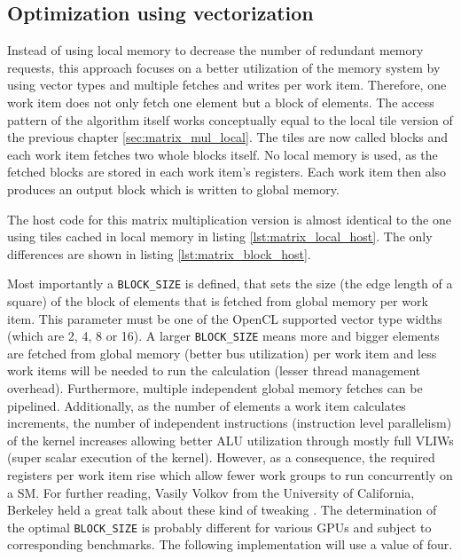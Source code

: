 \subsection{Optimization using vectorization}
\label{sec:matrix_mul_vec}
Instead of using local memory to decrease the number of redundant memory requests, this approach focuses on a better utilization of the memory system by using vector types and multiple fetches and writes per work item. Therefore, one work item does not only fetch one element but a block of elements.
The access pattern of the algorithm itself works conceptually equal to the local tile version of the previous chapter \ref{sec:matrix_mul_local}. The tiles are now called blocks and each work item fetches two whole blocks itself. No local memory is used, as the fetched blocks are stored in each work item's registers. Each work item then also produces an output block which is written to global memory.

The host code for this matrix multiplication version is almost identical to the one using tiles cached in local memory in listing \ref{lst:matrix_local_host}. The only differences are shown in listing \ref{lst:matrix_block_host}.



Most importantly a \lstinline!BLOCK_SIZE! is defined, that sets the size (the edge length of a square) of the block of elements that is fetched from global memory per work item. This parameter must be one of the OpenCL supported vector type widths (which are 2, 4, 8 or 16). A larger \lstinline!BLOCK_SIZE! means more and bigger elements are fetched from global memory (better bus utilization) per work item and less work items will be needed to run the calculation (lesser thread management overhead). Furthermore, multiple independent global memory fetches can be pipelined. Additionally, as the number of elements a work item calculates increments, the number of independent instructions (instruction level parallelism) of the kernel increases allowing better ALU utilization through mostly full VLIWs (super scalar execution of the kernel). However, as a consequence, the required registers per work item rise which allow fewer work groups to run concurrently on a SM. For further reading, Vasily Volkov from the University of California, Berkeley held a great talk about these kind of tweaking \cite{volkov}.
The determination of the optimal \lstinline!BLOCK_SIZE! is probably different for various GPUs and subject to corresponding benchmarks. The following implementation will use a value of four.
 
